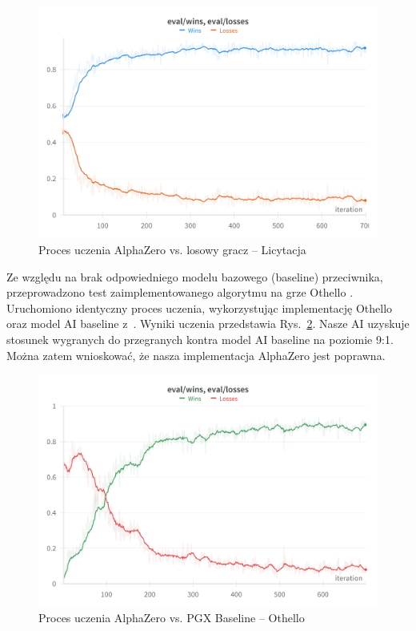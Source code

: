\begin{figure}[!]
    \centering
    \includegraphics[width=\textwidth]{img/wykresy/bzero-eval.png}
    \caption{Proces uczenia AlphaZero vs. losowy gracz -- Licytacja}
    \label{fig:bzero-eval}
\end{figure}

Ze względu na brak odpowiedniego modelu
bazowego (baseline) przeciwnika,
przeprowadzono test zaimplementowanego algorytmu
na grze Othello \cite{Othello}.
Uruchomiono identyczny proces uczenia,
wykorzystując implementację Othello oraz
model AI baseline z~\cite{PGX}.
Wyniki uczenia przedstawia Rys.~\ref{fig:othello-eval}.
Nasze AI uzyskuje stosunek wygranych do przegranych
kontra model AI baseline na poziomie 9:1.
Można zatem wnioskować, że nasza implementacja
AlphaZero jest poprawna.


\begin{figure}[h!]
  \centering
  \includegraphics[width=\textwidth]{img/wykresy/othello-eval.png}
  \caption{Proces uczenia AlphaZero vs. PGX Baseline -- Othello}
  \label{fig:othello-eval}
\end{figure}

